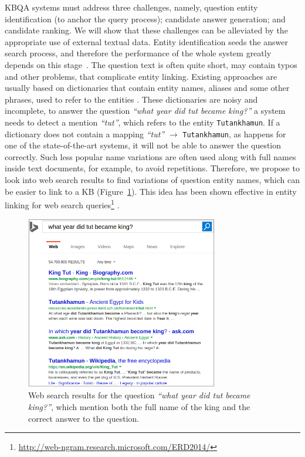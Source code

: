 KBQA systems must address three challenges, namely, question entity identification (to anchor the query process); candidate answer generation; and candidate ranking.
We will show that these challenges can be alleviated by the appropriate use of external textual data.
Entity identification seeds the answer search process, and therefore the performance of the whole system greatly depends on this stage~\cite{yao-scratch-qa-naacl2015}.
The question text is often quite short, may contain typos and other problems, that complicate entity linking.
Existing approaches are usually based on dictionaries that contain entity names, aliases and some other phrases, used to refer to the entities \cite{SPITKOVSKY12.266}.
These dictionaries are noisy and incomplete, \eg to answer the question \textit{``what year did tut became king?''} a system needs to detect a mention \textit{``tut''}, which refers to the entity \texttt{Tutankhamun}.
If a dictionary does not contain a mapping \textit{``tut''} $\rightarrow$ \texttt{Tutankhamun}, as happens for one of the state-of-the-art systems, it will not be able to answer the question correctly.
Such less popular name variations are often used along with full names inside text documents, for example, to avoid repetitions.
Therefore, we propose to look into web search results to find variations of question entity names, which can be easier to link to a KB (Figure~\ref{figure:factoid:text2kb:web_search_entitylink}).
This idea has been shown effective in entity linking for web search queries\footnote{\href{url}{http://web-ngram.research.microsoft.com/ERD2014/}} \cite{SMAPH_ERD:2014}.

\begin{figure}[t]
\centering
\includegraphics[width=0.75\textwidth]{img/web_search_entitylink}
\caption{Web search results for the question \textit{``what year did tut became king?''}, which mention both the full name of the king and the correct answer to the question.}
\label{figure:factoid:text2kb:web_search_entitylink}
\end{figure}

